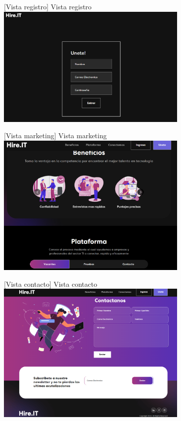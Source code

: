     \vspace{2mm}
    \begin{minipage}{0.9\textwidth}
    \centering
    [{Vista registro}]{ Vista registro }
    \label{prot3}
     \includegraphics[width=0.7\textwidth]{Images/prot3.png}
    \end{minipage}
    
    \vspace{2mm}
    \begin{minipage}{0.9\textwidth}
    \centering
    [{Vista marketing}]{ Vista marketing }
    \label{prot4}
     \includegraphics[width=0.7\textwidth]{Images/prot4.png}
    \end{minipage}
    
    \vspace{2mm}
    \begin{minipage}{0.9\textwidth}
    \centering
    [{Vista contacto}]{ Vista contacto }
    \label{prot5}
     \includegraphics[width=0.7\textwidth]{Images/prot5.png}
    \end{minipage}
    

